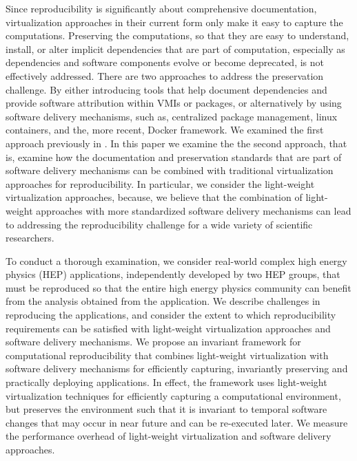 Since reproducibility is significantly about comprehensive documentation, virtualization approaches in their current form only make it easy to capture the computations. Preserving the computations, so that they are easy to understand, install, or alter implicit dependencies that are part of computation, especially as dependencies and software components evolve or become deprecated, is not effectively addressed. There are two approaches to address the preservation challenge. By either introducing tools that help document dependencies and provide software attribution within VMIs or packages, or alternatively by using software delivery mechanisms, such as, centralized package management, linux containers, and the, more recent, Docker framework. We examined the first approach previously in \cite{}. In this paper we examine the the second approach, that is, examine how the documentation and preservation standards that are part of software delivery mechanisms can be combined with traditional virtualization approaches for reproducibility. In particular, we consider the light-weight virtualization approaches, because, we believe that the combination of light-weight approaches with more standardized software delivery mechanisms can lead to addressing the reproducibility challenge for a wide variety of scientific researchers. 

To conduct a thorough examination, we consider real-world complex high energy physics (HEP) applications, independently developed by two HEP groups, that must be reproduced so that the entire high energy physics community can benefit from the analysis obtained from the application. We describe challenges in reproducing the applications, and consider the extent to which reproducibility requirements can be satisfied with light-weight virtualization approaches and software delivery mechanisms. We propose an invariant framework for computational reproducibility that combines light-weight virtualization with software delivery mechanisms for efficiently capturing, invariantly preserving and practically deploying applications. In effect, the framework uses light-weight virtualization techniques for efficiently capturing a computational environment, but preserves the environment such that it is invariant to temporal software changes that may occur in near future and can be re-executed later. We measure the performance overhead of  light-weight virtualization and software delivery approaches. 

